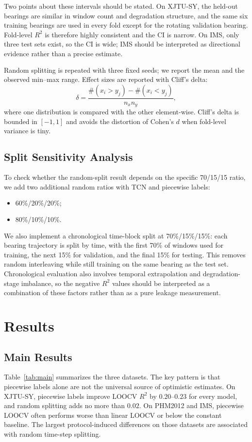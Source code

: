 \documentclass[pdflatex,sn-mathphys-num]{sn-jnl}
\begin{document}
Two points about these intervals should be stated. On XJTU-SY, the held-out bearings are similar in window count and degradation structure, and the same six training bearings are used in every fold except for the rotating validation bearing. Fold-level $R^2$ is therefore highly consistent and the CI is narrow. On IMS, only three test sets exist, so the CI is wide; IMS should be interpreted as directional evidence rather than a precise estimate.

Random splitting is repeated with three fixed seeds; we report the mean and the observed min--max range. Effect sizes are reported with Cliff's delta:
\begin{equation}
\delta = \frac{\#(x_i > y_j) - \#(x_i < y_j)}{n_x n_y},
\label{eq:cliff}
\end{equation}
where one distribution is compared with the other element-wise. Cliff's delta is bounded in $[-1, 1]$ and avoids the distortion of Cohen's $d$ when fold-level variance is tiny.

\subsection{Split Sensitivity Analysis}
To check whether the random-split result depends on the specific 70/15/15 ratio, we add two additional random ratios with TCN and piecewise labels:
\begin{itemize}
    \item 60\%/20\%/20\%;
    \item 80\%/10\%/10\%.
\end{itemize}
We also implement a chronological time-block split at 70\%/15\%/15\%: each bearing trajectory is split by time, with the first 70\% of windows used for training, the next 15\% for validation, and the final 15\% for testing. This removes random interleaving while still training on the same bearing as the test set. Chronological evaluation also involves temporal extrapolation and degradation-stage imbalance, so the negative $R^2$ values should be interpreted as a combination of these factors rather than as a pure leakage measurement.

\section{Results}
\subsection{Main Results}
Table~\ref{tab:main} summarizes the three datasets. The key pattern is that piecewise labels alone are not the universal source of optimistic estimates. On XJTU-SY, piecewise labels improve LOOCV $R^2$ by $0.20$--$0.23$ for every model, and random splitting adds no more than $0.02$. On PHM2012 and IMS, piecewise LOOCV often performs worse than linear LOOCV or below the constant baseline. The largest protocol-induced differences on those datasets are associated with random time-step splitting.
\end{document}
